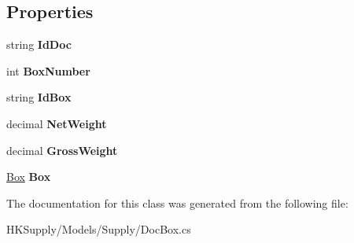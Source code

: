 \subsection*{Properties}
\begin{DoxyCompactItemize}
\item 
\mbox{\label{class_h_k_supply_1_1_models_1_1_supply_1_1_doc_box_aa8be88709727edceadb07481e5366da5}} 
string {\bfseries Id\+Doc}
\item 
\mbox{\label{class_h_k_supply_1_1_models_1_1_supply_1_1_doc_box_a5f2f25c63e0c5f29a4ac204b39aa79a2}} 
int {\bfseries Box\+Number}
\item 
\mbox{\label{class_h_k_supply_1_1_models_1_1_supply_1_1_doc_box_ae2c109666473a1e90945b83b4c7923b8}} 
string {\bfseries Id\+Box}
\item 
\mbox{\label{class_h_k_supply_1_1_models_1_1_supply_1_1_doc_box_a69643d77c2cbbd342700bfee99ae20a5}} 
decimal {\bfseries Net\+Weight}
\item 
\mbox{\label{class_h_k_supply_1_1_models_1_1_supply_1_1_doc_box_ac7713ae22c9e59ba04b26e69dc3abb98}} 
decimal {\bfseries Gross\+Weight}
\item 
\mbox{\label{class_h_k_supply_1_1_models_1_1_supply_1_1_doc_box_a8e7b05421add2ee665e17907884b0318}} 
\mbox{\hyperlink{class_h_k_supply_1_1_models_1_1_supply_1_1_box}{Box}} {\bfseries Box}
\end{DoxyCompactItemize}


The documentation for this class was generated from the following file\+:\begin{DoxyCompactItemize}
\item 
H\+K\+Supply/\+Models/\+Supply/Doc\+Box.\+cs\end{DoxyCompactItemize}
